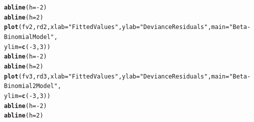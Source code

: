 \documentclass[oneside]{book}\usepackage[]{graphicx}\usepackage[svgnames]{xcolor}
\makeatletter
\newcommand{\hlnum}[1]{\textcolor[rgb]{0.686,0.059,0.569}{#1}}%
\newcommand{\hlstr}[1]{\textcolor[rgb]{0.192,0.494,0.8}{#1}}%
\newcommand{\hlopt}[1]{\textcolor[rgb]{0,0,0}{#1}}%
\newcommand{\hlstd}[1]{\textcolor[rgb]{0.345,0.345,0.345}{#1}}%
\newcommand{\hlkwc}[1]{\textcolor[rgb]{0.333,0.667,0.333}{#1}}%
\newcommand{\hlkwd}[1]{\textcolor[rgb]{0.737,0.353,0.396}{\textbf{#1}}}%
\newenvironment{kframe}{%
 \def\at@end@of@kframe{}%
 \ifinner\ifhmode%
  \def\at@end@of@kframe{\end{minipage}}%
  \begin{minipage}{\columnwidth}%
 \fi\fi%
 \def\FrameCommand##1{\hskip\@totalleftmargin \hskip-\fboxsep
 \colorbox{shadecolor}{##1}\hskip-\fboxsep
     \hskip-\linewidth \hskip-\@totalleftmargin \hskip\columnwidth}%
 \MakeFramed {\advance\hsize-\width
   \@totalleftmargin\z@ \linewidth\hsize
   \@setminipage}}%
 {\par\unskip\endMakeFramed%
 \at@end@of@kframe}
\newenvironment{knitrout}{}{} %
\makeatother
\begin{document}
\begin{knitrout}
\begin{kframe}
\begin{alltt}
\hlkwd{abline}\hlstd{(}\hlkwc{h} \hlstd{=} \hlopt{-}\hlnum{2}\hlstd{)}
\hlkwd{abline}\hlstd{(}\hlkwc{h} \hlstd{=} \hlnum{2}\hlstd{)}
\hlkwd{plot}\hlstd{(fv2, rd2,} \hlkwc{xlab} \hlstd{=} \hlstr{"Fitted Values"}\hlstd{,} \hlkwc{ylab} \hlstd{=} \hlstr{"Deviance Residuals"}\hlstd{,} \hlkwc{main} \hlstd{=} \hlstr{"Beta-Binomial Model"}\hlstd{,}
  \hlkwc{ylim} \hlstd{=} \hlkwd{c}\hlstd{(}\hlopt{-}\hlnum{3}\hlstd{,} \hlnum{3}\hlstd{))}
\hlkwd{abline}\hlstd{(}\hlkwc{h} \hlstd{=} \hlopt{-}\hlnum{2}\hlstd{)}
\hlkwd{abline}\hlstd{(}\hlkwc{h} \hlstd{=} \hlnum{2}\hlstd{)}
\hlkwd{plot}\hlstd{(fv3, rd3,} \hlkwc{xlab} \hlstd{=} \hlstr{"Fitted Values"}\hlstd{,} \hlkwc{ylab} \hlstd{=} \hlstr{"Deviance Residuals"}\hlstd{,} \hlkwc{main} \hlstd{=} \hlstr{"Beta-Binomial2 Model"}\hlstd{,}
  \hlkwc{ylim} \hlstd{=} \hlkwd{c}\hlstd{(}\hlopt{-}\hlnum{3}\hlstd{,} \hlnum{3}\hlstd{))}
\hlkwd{abline}\hlstd{(}\hlkwc{h} \hlstd{=} \hlopt{-}\hlnum{2}\hlstd{)}
\hlkwd{abline}\hlstd{(}\hlkwc{h} \hlstd{=} \hlnum{2}\hlstd{)}
\end{alltt}
\end{kframe}
\end{knitrout}
\end{document}
